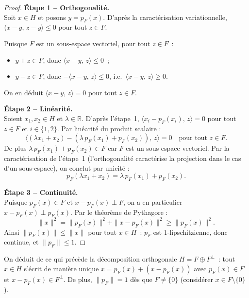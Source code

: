 \documentclass[11pt,a4paper]{article}
\begin{document}
\begin{proof}
\noindent
\textbf{Étape 1 -- Orthogonalité.}\\
Soit $x \in H$ et posons $y = p_F(x)$. D'après la caractérisation variationnelle,
$\langle x - y,\, z - y\rangle \leq 0$ pour tout $z \in F$.

Puisque $F$ est un sous-espace vectoriel, pour tout $z \in F$~:
\begin{itemize}
\item $y + z \in F$, donc $\langle x - y,\, z\rangle \leq 0$~;
\item $y - z \in F$, donc $-\langle x - y,\, z\rangle \leq 0$, i.e.\ $\langle x - y,\, z\rangle \geq 0$.
\end{itemize}
On en déduit $\langle x - y,\, z\rangle = 0$ pour tout $z \in F$.

\textbf{Étape 2 -- Linéarité.}\\
Soient $x_1, x_2 \in H$ et $\lambda \in \mathbb{R}$. D'après l'étape~1,
$\langle x_i - p_F(x_i),\, z\rangle = 0$ pour tout $z \in F$ et $i \in \{1,2\}$.
Par linéarité du produit scalaire :
\[
\bigl\langle (\lambda x_1 + x_2) - (\lambda\, p_F(x_1) + p_F(x_2)),\, z\bigr\rangle = 0
\quad \text{pour tout } z \in F.
\]
De plus $\lambda\, p_F(x_1) + p_F(x_2) \in F$ car $F$ est un sous-espace vectoriel.
Par la caractérisation de l'étape~1 (l'orthogonalité caractérise la projection
dans le cas d'un sous-espace), on conclut par unicité :
\[
p_F(\lambda x_1 + x_2) = \lambda\, p_F(x_1) + p_F(x_2).
\]

\textbf{Étape 3 -- Continuité.}\\
Puisque $p_F(x) \in F$ et $x - p_F(x) \perp F$, on a en particulier
$x - p_F(x) \perp p_F(x)$. Par le théorème de Pythagore :
\[
\|x\|^2 = \|p_F(x)\|^2 + \|x - p_F(x)\|^2 \geq \|p_F(x)\|^2.
\]
Ainsi $\|p_F(x)\| \leq \|x\|$ pour tout $x \in H$~: $p_F$ est $1$-lipschitzienne,
donc continue, et $\|p_F\| \leq 1$.
\end{proof}

\begin{remark}
On déduit de ce qui précède la décomposition orthogonale
$H = F \oplus F^\perp$~: tout $x \in H$ s'écrit de manière unique
$x = p_F(x) + (x - p_F(x))$ avec $p_F(x) \in F$ et $x - p_F(x) \in F^\perp$.
De plus, $\|p_F\| = 1$ dès que $F \neq \{0\}$ (considérer $x \in F \setminus \{0\}$).
\end{remark}
\end{document}
